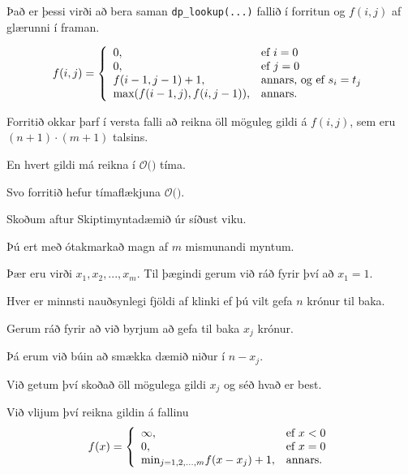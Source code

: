 {
}

{
	{
		\item<1-> Það er þessi virði að bera saman \texttt{dp\_lookup(...)} fallið í forritun og $f(i, j)$ af glærunni í framan.
	}
	\tiny
	\[
		f(i, j) =
		\left \{
		\env{array}
		{
			{l l}
			0, & \text{ef $i = 0$}\\
			0, & \text{ef $j = 0$}\\
			f(i - 1, j - 1) + 1, & \text{annars, og ef $s_i = t_j$}\\
			\text{max}(f(i - 1, j), f(i, j - 1)), & \text{annars}.
		}
		\right .
	\]
}

{
	{
		\item<1-> Forritið okkar þarf í versta falli að reikna öll möguleg gildi á $f(i, j)$, sem eru $(n + 1) \cdot (m + 1)$ talsins.
		\item<2-> En hvert gildi má reikna í $\mathcal{O}($$)$ tíma.
		\item<4-> Svo forritið hefur tímaflækjuna $\mathcal{O}($\onslide<5->{$n \cdot m$}$)$.
	}
}

{
	{
		\item<1-> Skoðum aftur Skiptimyntadæmið úr síðust viku.
		\item<2-> Þú ert með ótakmarkað magn af $m$ mismunandi myntum.
		\item<3-> Þær eru virði  $x_1, x_2, ..., x_m$. Til þægindi gerum við ráð fyrir því að $x_1 = 1$.
		\item<4-> Hver er minnsti nauðsynlegi fjöldi af klinki ef þú vilt gefa $n$ krónur til baka.
	}
}

{
	{
		\item<1-> Gerum ráð fyrir að við byrjum að gefa til baka $x_j$ krónur.
		\item<2-> Þá erum við búin að smækka dæmið niður í $n - x_j$.
		\item<3-> Við getum því skoðað öll mögulega gildi $x_j$ og séð hvað er best.
		\item<4-> Við vlijum því reikna gildin á fallinu
		\[
			f(x) = 
			\left \{
			\env{array}
			{
				{l l}
				\infty, & \text{ef $x < 0$}\\
				0, & \text{ef $x = 0$}\\
				\text{min}_{j = 1, 2, ..., m} f(x - x_j) + 1, & \text{annars}.
			}
			\right .
		\]
	}
}

{
}



























